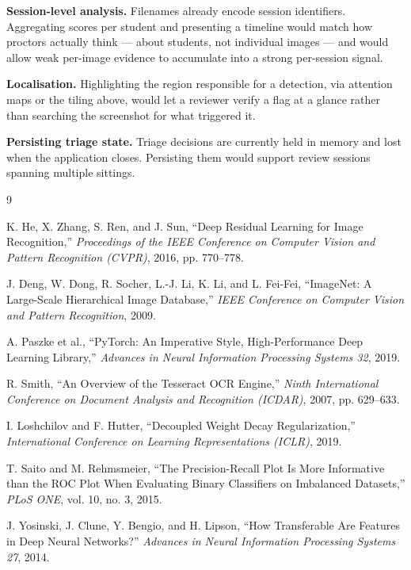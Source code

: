 \documentclass[12pt,oneside]{report}
\begin{document}
\textbf{Session-level analysis.} Filenames already encode session identifiers.
Aggregating scores per student and presenting a timeline would match how
proctors actually think --- about students, not individual images --- and would
allow weak per-image evidence to accumulate into a strong per-session signal.

\textbf{Localisation.} Highlighting the region responsible for a detection,
via attention maps or the tiling above, would let a reviewer verify a flag at a
glance rather than searching the screenshot for what triggered it.

\textbf{Persisting triage state.} Triage decisions are currently held in memory
and lost when the application closes. Persisting them would support review
sessions spanning multiple sittings.

\begin{thebibliography}{9}

K. He, X. Zhang, S. Ren, and J. Sun,
``Deep Residual Learning for Image Recognition,''
\emph{Proceedings of the IEEE Conference on Computer Vision and Pattern
Recognition (CVPR)}, 2016, pp. 770--778.

J. Deng, W. Dong, R. Socher, L.-J. Li, K. Li, and L. Fei-Fei,
``ImageNet: A Large-Scale Hierarchical Image Database,''
\emph{IEEE Conference on Computer Vision and Pattern Recognition}, 2009.

A. Paszke et al.,
``PyTorch: An Imperative Style, High-Performance Deep Learning Library,''
\emph{Advances in Neural Information Processing Systems 32}, 2019.

R. Smith,
``An Overview of the Tesseract OCR Engine,''
\emph{Ninth International Conference on Document Analysis and Recognition
(ICDAR)}, 2007, pp. 629--633.

I. Loshchilov and F. Hutter,
``Decoupled Weight Decay Regularization,''
\emph{International Conference on Learning Representations (ICLR)}, 2019.

T. Saito and M. Rehmsmeier,
``The Precision-Recall Plot Is More Informative than the ROC Plot When
Evaluating Binary Classifiers on Imbalanced Datasets,''
\emph{PLoS ONE}, vol. 10, no. 3, 2015.

J. Yosinski, J. Clune, Y. Bengio, and H. Lipson,
``How Transferable Are Features in Deep Neural Networks?''
\emph{Advances in Neural Information Processing Systems 27}, 2014.

\end{thebibliography}
\end{document}
